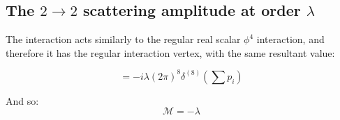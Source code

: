 \documentclass{article}
\begin{document}
\subsection{The $2 \rightarrow 2$ scattering amplitude at order $\lambda$}
The interaction acts similarly to the regular real scalar $\phi^4$ interaction, and therefore it has the regular interaction vertex, with the same resultant value:
\begin{center}
\begin{equation}
    = -i\lambda (2\pi)^8 \delta^{(8)}\left(\sum p_i\right)
\end{equation}
\end{center}
And so:
\begin{equation}
    \mathcal{M} = -\lambda
\end{equation}
\end{document}
